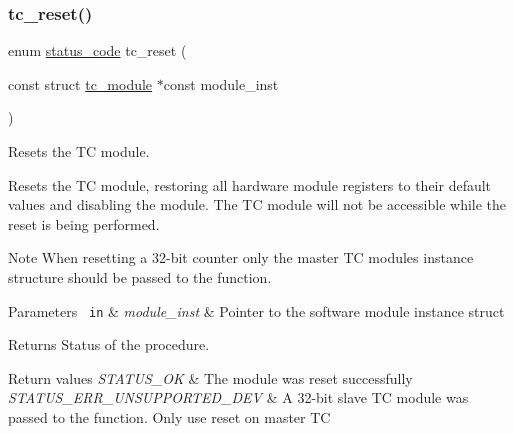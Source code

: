 \subsubsection{\texorpdfstring{tc\_reset()}{tc\_reset()}}
{\footnotesize\ttfamily enum \mbox{\hyperlink{group__group__sam0__utils__status__codes_ga751c892e5a46b8e7d282085a5a5bf151}{status\+\_\+code}} tc\+\_\+reset (\begin{DoxyParamCaption}\item[{const struct \mbox{\hyperlink{structtc__module}{tc\+\_\+module}} $\ast$const}]{module\+\_\+inst }\end{DoxyParamCaption})}



Resets the TC module. 

Resets the TC module, restoring all hardware module registers to their default values and disabling the module. The TC module will not be accessible while the reset is being performed.

\begin{DoxyNote}{Note}
When resetting a 32-\/bit counter only the master TC module\textquotesingle{}s instance structure should be passed to the function.
\end{DoxyNote}

\begin{DoxyParams}[1]{Parameters}
\mbox{\texttt{ in}}  & {\em module\+\_\+inst} & Pointer to the software module instance struct\\
\hline
\end{DoxyParams}
\begin{DoxyReturn}{Returns}
Status of the procedure. 
\end{DoxyReturn}

\begin{DoxyRetVals}{Return values}
{\em S\+T\+A\+T\+U\+S\+\_\+\+OK} & The module was reset successfully \\
\hline
{\em S\+T\+A\+T\+U\+S\+\_\+\+E\+R\+R\+\_\+\+U\+N\+S\+U\+P\+P\+O\+R\+T\+E\+D\+\_\+\+D\+EV} & A 32-\/bit slave TC module was passed to the function. Only use reset on master TC \\
\hline
\end{DoxyRetVals}
\mbox{\label{group__asfdoc__sam0__tc__group_ga687208b24fd33a1da0cbe683adc15fa6}} 
